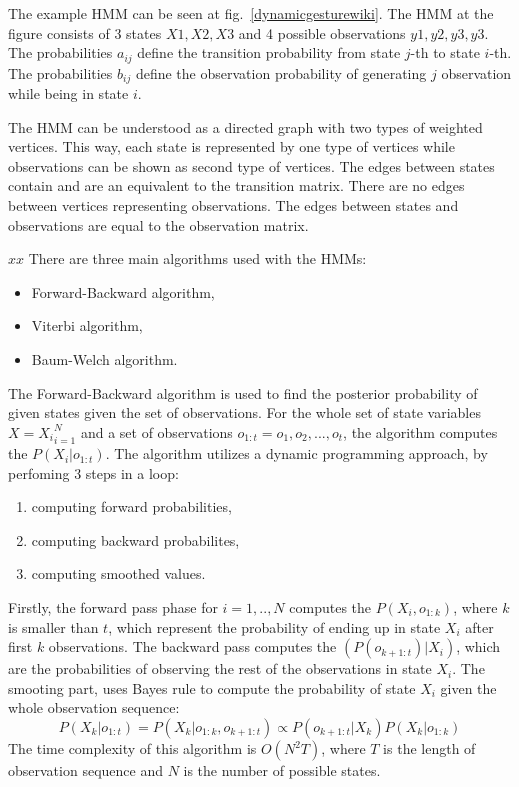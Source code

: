 
The example HMM can be seen at fig.~\ref{dynamicgesturewiki}.
The HMM at the figure consists of 3 states ${X1, X2, X3}$ and 4 possible observations ${y1, y2, y3, y3}$.
The probabilities $a_{ij}$ define the transition probability from state $j$-th to state $i$-th. 
The probabilities $b_{ij}$ define the observation probability of generating $j$ observation while being in state $i$.

The HMM can be understood as a directed graph with two types of weighted vertices. 
This way, each state is represented by one type of vertices while observations can be shown as second type of vertices.
The edges between states contain and are an equivalent to the transition matrix. 
There are no edges between vertices representing observations.
The edges between states and observations are equal to the observation matrix.

$ xx $
There are three main algorithms used with the HMMs:
\begin{itemize}
\item Forward-Backward algorithm, 
\item Viterbi algorithm,
\item Baum-Welch algorithm.
\end{itemize}

The Forward-Backward algorithm is used to find the posterior probability of given states given the set of observations.
For the whole set of state variables $X = {X_i}_{i=1}^{N}$ and a set of observations $o_{1:t} = o_1, o_2,...,o_t$, the algorithm computes the $P(X_i | o_{1:t})$.
The algorithm utilizes a dynamic programming approach, by perfoming 3 steps in a loop: 
\begin{enumerate}
\item computing forward probabilities,
\item computing backward probabilites,
\item computing smoothed values.
\end{enumerate}
Firstly, the forward pass phase for $i=1,..,N$ computes the $P(X_i, o_{1:k})$, where $k$ is smaller than $t$, which represent the probability of ending up in state $X_i$ after first $k$ observations. 
The backward pass computes the $(P(o_{k+1:t}) | X_i)$, which are the probabilities of observing the rest of the observations in state $X_i$.
The smooting part, uses Bayes rule to compute the probability of state $X_i$ given the whole observation sequence:
\begin{equation}
P(X_k | o_{1:t}) = P(X_k | o_{1:k}, o_{k+1:t}) \propto P(o_{k+1:t} | X_k) P(X_k | o_{1:k})
\end{equation}
The time complexity of this algorithm is $O(N^2 T)$, where $T$ is the length of observation sequence and $N$ is the number of possible states.

